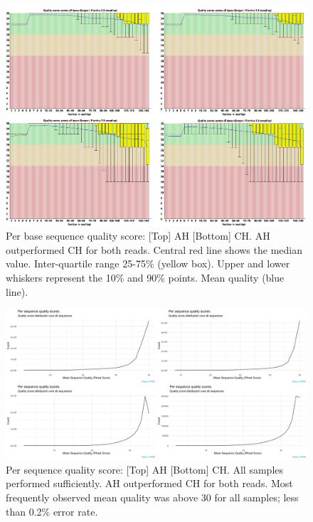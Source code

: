 \documentclass{article}
\begin{document}
\begin{figure}[h] \hspace*{0cm} 
\begin{center}
    \includegraphics[scale=0.3]{fastqc/p1}
	\caption{Per base sequence quality score: [Top] AH [Bottom] CH. AH outperformed CH for both reads.
		Central red line shows the median value.
	Inter-quartile range 25-75\% (yellow box).
	Upper and lower whiskers represent the 10\% and 90\% points.
	Mean quality (blue line).
	}
	\label{fig:p1}
\end{center}
\end{figure}

\begin{figure}[h] \hspace*{0cm} 
\begin{center}
    \includegraphics[scale=0.25]{fastqcr/p2}
	\caption{Per sequence quality score: [Top] AH [Bottom] CH. All samples performed sufficiently.  AH outperformed CH for both reads.
	Most frequently observed mean quality was above 30 for all samples; less than 0.2\% error rate.
	}
	\label{fig:p2}
\end{center}
\end{figure}
\end{document}

